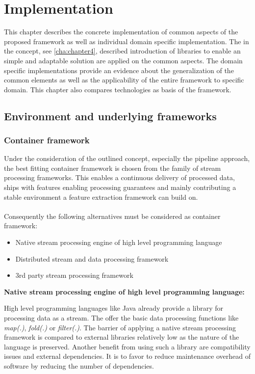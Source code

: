 \chapter{Implementation\label{cha:chapter5}}

This chapter describes the concrete implementation of common aspects of the proposed framework as well as individual domain specific implementation. The in the concept, see \ref{cha:chapter4}, described introduction of libraries to enable an simple and adaptable solution are applied on the common aspects. The domain specific implementations provide an evidence about the generalization of the common elements as well as the applicability of the entire framework to specific domain. This chapter also compares technologies as basis of the framework. 

\section{Environment and underlying frameworks\label{sec:env}}

\subsection{Container framework}

Under the consideration of the outlined concept, especially the pipeline approach, the best fitting container framework is chosen from the family of stream processing frameworks. This enables a continuous delivery of processed data, ships with features enabling processing guarantees and mainly contributing a stable environment a feature extraction framework can build on. 
\\\\
Consequently the following alternatives must be considered as container framework:
\begin{itemize}
\item Native stream processing engine of high level programming language
\item Distributed stream and data processing framework
\item 3rd party stream processing framework
\end{itemize}

\noindent\textbf{Native stream processing engine of high level programming language:}

\noindent High level programming languages like Java already provide a library for processing data as a stream. The offer the basic data processing functions like \textit{map(.)}, \textit{fold(.)} or \textit{filter(.)}. The barrier of applying a native stream processing framework is compared to external libraries relatively low as the nature of the language is preserved. Another benefit from using such a library are compatibility issues and external dependencies. It is to favor to reduce maintenance overhead of software by reducing the number of dependencies. 

